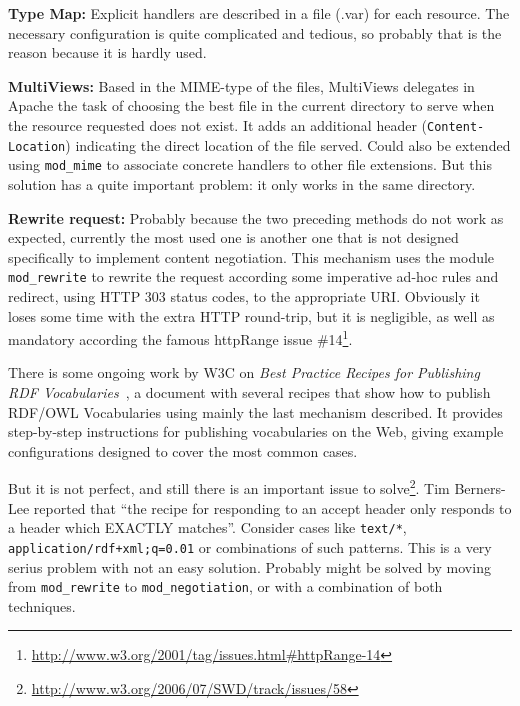 \documentclass{../templates/llncs}
\begin{document}
\begin{description}

  \item \textbf{Type Map:} Explicit handlers are described in a file (.var) for 
        each resource. The necessary configuration is quite complicated and 
        tedious, so probably that is the reason because it is hardly used.

  \item \textbf{MultiViews:} Based in the MIME-type of the files, MultiViews 
        delegates in Apache the task of choosing the best file in the current 
        directory to serve when the resource requested does not exist. It adds 
        an additional header (\texttt{Content-Location}) indicating the direct 
        location of the file served. Could also be extended using \texttt{mod\_mime} 
        to associate concrete handlers to other file extensions. But this solution
        has a quite important problem: it only works in the same directory.

  \item \textbf{Rewrite request:} Probably because the two preceding methods 
        do not work as expected, currently the most used one is another one 
        that is not designed specifically to implement content negotiation. 
        This mechanism uses the module \texttt{mod\_rewrite} to rewrite the 
        request according some imperative ad-hoc rules and redirect, using 
        HTTP 303 status codes, to the appropriate URI. Obviously it loses 
        some time with the extra HTTP round-trip, but it is negligible,
        as well as mandatory according the famous httpRange issue
        \#14\footnote{\url{http://www.w3.org/2001/tag/issues.html#httpRange-14}}.

\end{description}

There is some ongoing work by W3C on \textit{Best Practice Recipes for Publishing 
RDF Vocabularies}~\cite{Recipes}, a document with several recipes that show how 
to publish RDF/OWL Vocabularies using mainly the last mechanism described. It 
provides step-by-step instructions for publishing vocabularies on the Web, giving 
example configurations designed to cover the most common cases.

But it is not perfect, and still there is an important issue to 
solve\footnote{\url{http://www.w3.org/2006/07/SWD/track/issues/58}}.
Tim Berners-Lee reported that ``the recipe for responding to an accept 
header only responds to a header which EXACTLY matches''. Consider cases 
like \texttt{text/*}, \texttt{application/rdf+xml;q=0.01} or combinations 
of such patterns. This is a very serius problem with not an easy solution. 
Probably might be solved by moving from \texttt{mod\_rewrite} to 
\texttt{mod\_negotiation}, or with a combination of both techniques.
\end{document}
